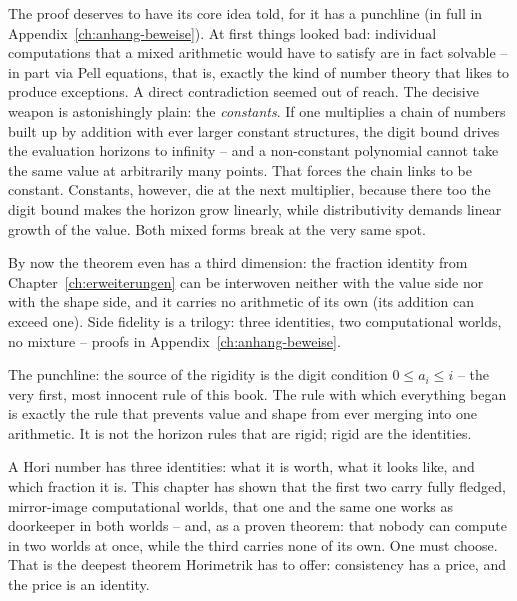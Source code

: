The proof deserves to have its core idea told, for it has a
punchline (in full in Appendix~\ref{ch:anhang-beweise}). At first things looked bad: individual
computations that a mixed arithmetic would have to satisfy are in
fact solvable -- in part via Pell equations, that is, exactly the
kind of number theory that likes to produce exceptions. A direct
contradiction seemed out of reach. The decisive weapon is
astonishingly plain: the \emph{constants}. If one multiplies a
chain of numbers built up by addition with ever larger constant
structures, the digit bound drives the evaluation horizons to
infinity -- and a non-constant polynomial cannot take the same
value at arbitrarily many points. That forces the chain links to
be constant. Constants, however, die at the next multiplier,
because there too the digit bound makes the horizon grow linearly,
while distributivity demands linear growth of the value. Both mixed
forms break at the very same spot.

By now the theorem even has a third dimension: the fraction
identity from Chapter~\ref{ch:erweiterungen} can be interwoven
neither with the value side nor with the shape side, and it carries
no arithmetic of its own (its addition can exceed
one). Side fidelity is a trilogy: three identities,
two computational worlds, no mixture -- proofs in
Appendix~\ref{ch:anhang-beweise}.

The punchline: the source of the rigidity is the digit condition
$0\le a_i\le i$ -- the very first, most innocent rule of this book.
The rule with which everything began is exactly the rule that
prevents value and shape from ever merging into one arithmetic. It
is not the horizon rules that are rigid; rigid are the identities.

\begin{oberflaeche}
A Hori number has three identities: what it is worth, what it
looks like, and which fraction it is. This chapter has shown that
the first two carry fully fledged, mirror-image computational
worlds, that one and the same one works as doorkeeper in both
worlds -- and, as a proven theorem: that nobody can compute in two
worlds at once, while the third carries none of its own. One must
choose. That is the deepest theorem Horimetrik has to offer:
consistency has a price, and the price is an identity.
\end{oberflaeche}
